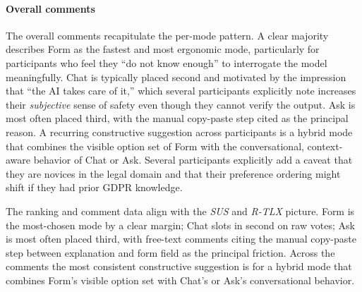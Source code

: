\paragraph{Overall comments} The overall comments
recapitulate the per-mode pattern. A clear majority describes Form as
the fastest and most ergonomic mode, particularly for participants
who feel they ``do not know enough'' to interrogate the model
meaningfully. Chat is typically placed second and motivated by the
impression that ``the AI takes care of it,'' which several
participants explicitly note increases their \emph{subjective} sense
of safety even though they cannot verify the output. Ask is most
often placed third, with the manual copy-paste step cited as the
principal reason. A recurring constructive suggestion across
participants is a hybrid mode that combines the visible option set of
Form with the conversational, context-aware behavior of Chat or
Ask. Several participants explicitly add a caveat that they are
novices in the legal domain and that their preference ordering might
shift if they had prior GDPR knowledge.

The ranking and comment data align with the \textit{SUS} and \textit{R-TLX}
picture. Form is the most-chosen mode by a clear margin; Chat
slots in second on raw votes; Ask is most often placed third,
with free-text comments citing the manual copy-paste step between
explanation and form field as the principal friction. Across the
comments the most consistent constructive suggestion is for a
hybrid mode that combines Form's visible option set with Chat's
or Ask's conversational behavior.
